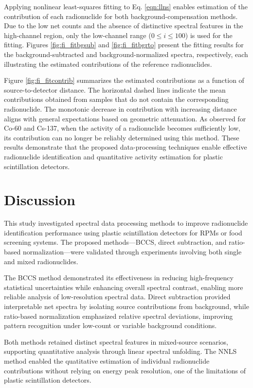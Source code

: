 \documentclass[10pt]{wlscirep}
\begin{document}
Applying nonlinear least-squares fitting to Eq. \ref{eqn:llns} enables estimation of the contribution of each radionuclide for both background-compensation methods. Due to the low net counts and the absence of distinctive spectral features in the high-channel region, only the low-channel range ($0 \le i \le 100$) is used for the fitting. Figures \ref{fig:fi_fitbgsub} and \ref{fig:fi_fitbgrto} present the fitting results for the background-subtracted and background-normalized spectra, respectively, each illustrating the estimated contributions of the reference radionuclides.

Figure \ref{fig:fi_fitcontrib} summarizes the estimated contributions as a function of source-to-detector distance. The horizontal dashed lines indicate the mean contributions obtained from samples that do not contain the corresponding radionuclide. The monotonic decrease in contribution with increasing distance aligns with general expectations based on geometric attenuation. As observed for Co-60 and Cs-137, when the activity of a radionuclide becomes sufficiently low, its contribution can no longer be reliably determined using this method. These results demonstrate that the proposed data-processing techniques enable effective radionuclide identification and quantitative activity estimation for plastic scintillation detectors.

\section*{Discussion}

This study investigated spectral data processing methods to improve radionuclide identification performance using plastic scintillation detectors for RPMs or food screening systems. The proposed methods—BCCS, direct subtraction, and ratio-based normalization—were validated through experiments involving both single and mixed radionuclides.

The BCCS method demonstrated its effectiveness in reducing high-frequency statistical uncertainties while enhancing overall spectral contrast, enabling more reliable analysis of low-resolution spectral data. Direct subtraction provided interpretable net spectra by isolating source contributions from background, while ratio-based normalization emphasized relative spectral deviations, improving pattern recognition under low-count or variable background conditions.

Both methods retained distinct spectral features in mixed-source scenarios, supporting quantitative analysis through linear spectral unfolding. The NNLS method enabled the quatitative estimation of individual radionuclide contributions without relying on energy peak resolution, one of the limitations of plastic scintillation detectors.
\end{document}
